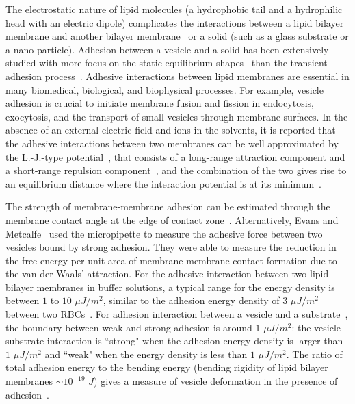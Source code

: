 \documentclass[prf,superscriptaddress,showkeys,longbibliography]{revtex4-1}
\begin{document}
The electrostatic nature of lipid molecules (a hydrophobic tail and a
hydrophilic head with an electric dipole) complicates the interactions
between a lipid bilayer membrane and another bilayer
membrane~\cite{EvansMetcalfe1984_BJ, Book_PhysicalBasisCellAdhesion,
Book_IntermolecularSurfaceForces, PerutkovaFrank-Bertoncelij2013_CSB} or
a solid (such as a glass substrate or a nano particle).  Adhesion
between a vesicle and a solid has been extensively studied with more
focus on the static equilibrium shapes~\cite{Seifert1990_PRA,BernardGuedeau-Boudeville2000_Langmuir,
ShiFengGao2006_ActaMechSin, LinFreund2007_IntJSolidsStructures,
GruhnFrankeDimova2007_Langmuir,das2008adhesion,
zhang2009phase,Agudo-Canalejo2015_ACSNano,Agudo-CanalejoLipowsky2015_NanoLett,
SteinkuhlerAgudo-Canalejo2016_BJ,Agudo-CanalejoLipowsky2017_SoftMatt}
than the transient adhesion process~\cite{cantat1999lift, suk-sei2001,
BlountMiksisDavis2013_PRSa}.  Adhesive interactions between lipid
membranes are essential in many biomedical, biological, and biophysical
processes.  For example, vesicle adhesion is crucial to initiate
membrane fusion and fission in endocytosis, exocytosis, and the
transport of small vesicles through membrane surfaces.  In the absence
of an external electric field and ions in the solvents, it is reported
that the adhesive interactions between two membranes can be well
approximated by the L.-J.-type
potential~\cite{FlormannAouane2017_SciReports}, that consists of a
long-range attraction component and a short-range repulsion
component~\cite{Book_IntermolecularSurfaceForces}, and the combination
of the two gives rise to an equilibrium distance where the interaction
potential is at its minimum~\cite{Book_IntermolecularSurfaceForces}. 

The strength of membrane-membrane adhesion can be estimated through the
membrane contact angle at the edge of contact
zone~\cite{RamachandranAndersonLealIsraelachvili2010_Langmuir,
MaresDanielIglic2012_SciWorldJ}.  Alternatively, Evans and
Metcalfe~\cite{EvansMetcalfe1984_BJ} used the micropipette to measure
the adhesive force between two vesicles bound by strong adhesion.  They
were able to measure the reduction in the free energy per unit area of
membrane-membrane contact formation due to the van der Waals'
attraction. For the adhesive interaction between two lipid bilayer
membranes in buffer solutions, a typical range for the energy density is
between $1$ to $10$ $\mu J/m^2$, similar to the adhesion energy density
of $3$ $\mu J/m^2$ between two
RBCs~\cite{FlormannAouane2017_SciReports}.  For adhesion interaction
between a vesicle and a substrate~\cite{GruhnFrankeDimova2007_Langmuir},
the boundary between weak and strong adhesion is around $1$ $\mu J/m^2$:
the vesicle-substrate interaction is ``strong" when the adhesion energy
density is larger than $1$ $\mu J/m^2$ and ``weak" when the energy
density is less than $1$ $\mu J/m^2$.  
The ratio of total adhesion energy to the bending energy
(bending rigidity of lipid bilayer membranes $\sim 10^{-19}$ $J$) gives
a measure of vesicle deformation in the presence of
adhesion~\cite{RamachandranAndersonLealIsraelachvili2010_Langmuir}. 
\end{document}

